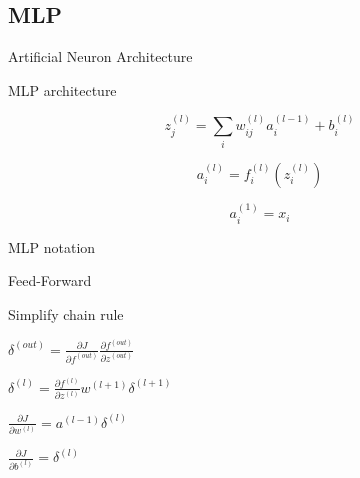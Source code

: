 \documentclass{KBook}
\begin{document}
\subsection{MLP}

	
	\begin{minipage}{0.39\textwidth}
		\centering 
		Artificial Neuron Architecture
		
	\end{minipage}
	\begin{minipage}{0.4\textwidth} 
		\centering
		MLP architecture
		
	\end{minipage}
	
	\begin{minipage}{0.39\textwidth}
		\[z_j^{(l)} = \sum_i w_{ij}^{(l)} a_{i}^{(l-1)} + b_{i}^{(l)}\]
		
		\[a_{i}^{(l)} = f_{i}^{(l)}(z_{i}^{(l)})\]
		
		\[a_{i}^{(1)} = x_{i}\]
	\end{minipage}
	\begin{minipage}{0.6\textwidth} 
		\centering
		MLP notation
		
	\end{minipage}
	
	Feed-Forward
	
	\begin{minipage}{0.3\textwidth}
		\small
		
		Simplify chain rule\boldmath
		
		$ \delta^{(out)} = \frac{\partial J}{\partial f^{(out)}} \frac{\partial f^{(out)}}{\partial z^{(out)}} $
		
		$ \delta^{(l)} = \frac{\partial f^{(l)}}{\partial z^{(l)}} w^{(l+1)} \delta^{(l+1)} $
		
		$ \frac{\partial J}{\partial w^{(l)}} = a^{(l-1)} \delta^{(l)} $
		
		$ \frac{\partial J}{\partial b^{(l)}} = \delta^{(l)} $
		
	\end{minipage}
	\begin{minipage}{0.69\textwidth} 
	\end{minipage}
	
\end{document}

